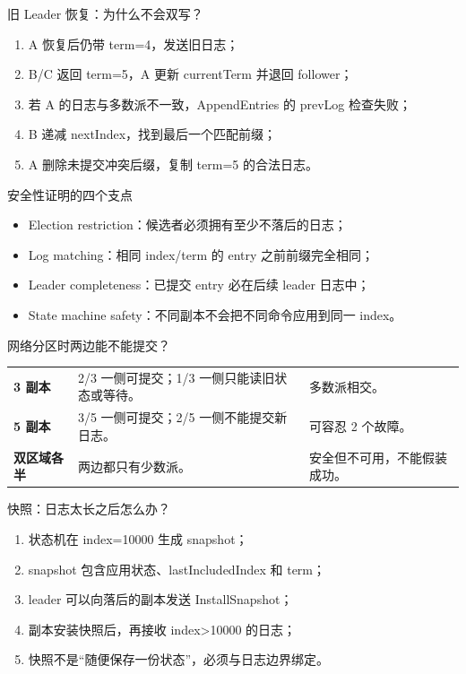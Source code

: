 \documentclass[UTF8,fontset=none,aspectratio=169,10pt]{beamer}
\begin{document}
\begin{frame}{旧 Leader 恢复：为什么不会双写？}
\begin{enumerate}
  \item A 恢复后仍带 term=4，发送旧日志；
  \item B/C 返回 term=5，A 更新 currentTerm 并退回 follower；
  \item 若 A 的日志与多数派不一致，AppendEntries 的 prevLog 检查失败；
  \item B 递减 nextIndex，找到最后一个匹配前缀；
  \item A 删除未提交冲突后缀，复制 term=5 的合法日志。
\end{enumerate}
\end{frame}

\begin{frame}{安全性证明的四个支点}
\begin{itemize}
  \item Election restriction：候选者必须拥有至少不落后的日志；
  \item Log matching：相同 index/term 的 entry 之前前缀完全相同；
  \item Leader completeness：已提交 entry 必在后续 leader 日志中；
  \item State machine safety：不同副本不会把不同命令应用到同一 index。
\end{itemize}
\vfill
{}
\end{frame}

\begin{frame}{网络分区时两边能不能提交？}
\begin{tabularx}{\linewidth}{>{\bfseries}p{2.8cm}XX}
\toprule
3 副本 & 2/3 一侧可提交；1/3 一侧只能读旧状态或等待。 & 多数派相交。 \\
5 副本 & 3/5 一侧可提交；2/5 一侧不能提交新日志。 & 可容忍 2 个故障。 \\
双区域各半 & 两边都只有少数派。 & 安全但不可用，不能假装成功。 \\
\bottomrule
\end{tabularx}
\end{frame}

\begin{frame}{快照：日志太长之后怎么办？}
\begin{enumerate}
  \item 状态机在 index=10000 生成 snapshot；
  \item snapshot 包含应用状态、lastIncludedIndex 和 term；
  \item leader 可以向落后的副本发送 InstallSnapshot；
  \item 副本安装快照后，再接收 index>10000 的日志；
  \item 快照不是“随便保存一份状态”，必须与日志边界绑定。
\end{enumerate}
\end{frame}
\end{document}
